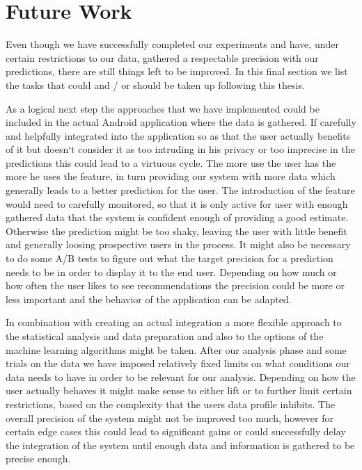 \newpage
\section{Future Work}
\label{sec:future_work}

Even though we have successfully completed our experiments and have, under certain restrictions to our data, gathered a respectable precision with our predictions, there are still things left to be improved. In this final section we list the tasks that could and / or should be taken up following this thesis.

As a logical next step the approaches that we have implemented could be included in the actual Android application where the data is gathered. If carefully and helpfully integrated into the application so as that the user actually benefits of it but doesn`t consider it as too intruding in his privacy or too imprecise in the predictions this could lead to a virtuous cycle. The more use the user has the more he uses the feature, in turn providing our system with more data which generally leads to a better prediction for the user. The introduction of the feature would need to carefully monitored, so that it is only active for user with enough gathered data that the system is confident enough of providing a good estimate. Otherwise the prediction might be too shaky, leaving the user with little benefit and generally loosing prospective users in the process. It might also be necessary to do some A/B tests to figure out what the target precision for a prediction needs to be in order to display it to the end user. Depending on how much or how often the user likes to see recommendations the precision could be more or less important and the behavior of the application can be adapted.

In combination with creating an actual integration a more flexible approach to the statistical analysis and data preparation and also to the options of the machine learning algorithms might be taken. After our analysis phase and some trials on the data we have imposed relatively fixed limits on what conditions our data needs to have in order to be relevant for our analysis. Depending on how the user actually behaves it might make sense to either lift or to further limit certain restrictions, based on the complexity that the users data profile inhibits. The overall precision of the system might not be improved too much, however for certain edge cases this could lead to significant gains or could successfully delay the integration of the system until enough data and information is gathered to be precise enough. 

